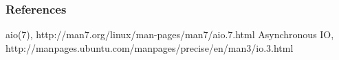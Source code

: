 \documentclass{beamer}
\begin{document}
\begin{frame}
    \frametitle{References}
    \footnotesize{
        \begin{thebibliography}{99}
                aio(7), http://man7.org/linux/man-pages/man7/aio.7.html
            	Asynchronous IO, http://manpages.ubuntu.com/manpages/precise/en/man3/io.3.html
        \end{thebibliography}
        }
\end{frame}
\end{document}
